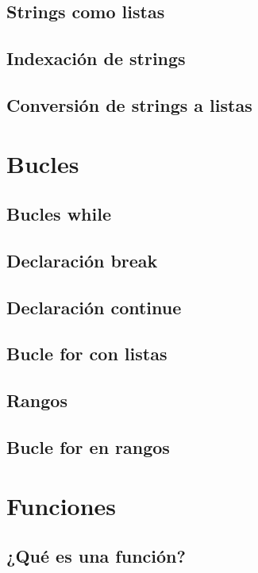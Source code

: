 \documentclass{report}
\begin{document}
\section{Strings como listas}

\section{Indexación de strings}

\section{Conversión de strings a listas}

\clearpage\chapter{Bucles}

\section{Bucles while}

\section{Declaración break}

\section{Declaración continue}

\section{Bucle for con listas}

\section{Rangos}

\section{Bucle for en rangos}

\clearpage\chapter{Funciones}

\section{¿Qué es una función?}
\end{document}
